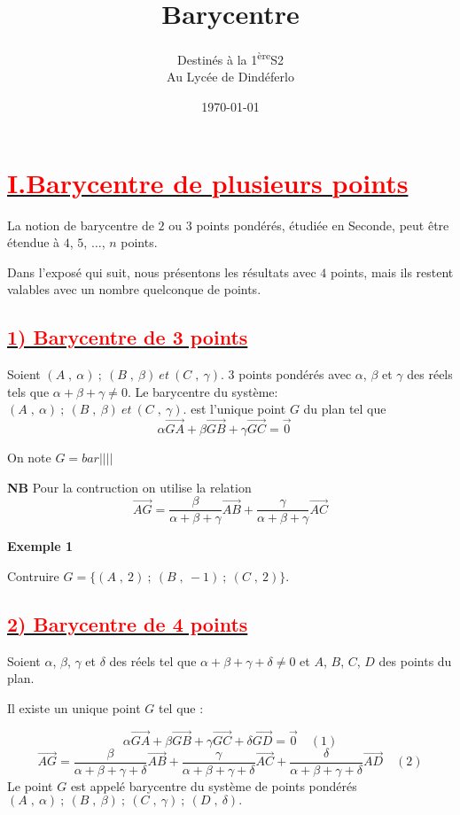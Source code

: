 \documentclass{article}
\author{Destinés à la 1\textsuperscript{ère}S2\\Au Lycée de Dindéferlo}
\title{\textbf{Barycentre}}
\date{\today}
\begin{document}
\maketitle
\newpage

\section*{\underline{\textbf{\textcolor{red}{I.Barycentre de plusieurs points}}}}
	La notion de barycentre de $2$ ou $3$ points pondérés, étudiée en Seconde, peut être étendue à $4$, $5$, $\ldots$, $n$ points. 
	
	Dans l'exposé qui suit, nous présentons les résultats avec $4$ points, mais ils restent valables avec un nombre quelconque de points.
	\subsection*{\underline{\textbf{\textcolor{red}{1) Barycentre de 3 points }}}}
	Soient $(A\;,\ \alpha)\ ;\ (B\;,\ \beta)\ et \ (C\;,\ \gamma).$ 3 points pondérés avec $\alpha$, $\beta$ et $\gamma$ des réels tels que $\alpha+\beta+\gamma\neq 0$. Le barycentre du système: $(A\;,\ \alpha)\ ;\ (B\;,\ \beta)\ et \ (C\;,\ \gamma).$ est l'unique point $G$ du plan tel que $$\alpha\overrightarrow{GA}+\beta\overrightarrow{GB}+\gamma\overrightarrow{GC}=\overrightarrow{0}\quad$$

On note  $G=bar||||$

\textbf{NB} Pour la contruction on utilise la relation $$\overrightarrow{AG}=\dfrac{\beta}{\alpha+\beta+\gamma}\overrightarrow{AB}+\dfrac{\gamma}{\alpha+\beta+\gamma}\overrightarrow{AC}$$

\textbf{Exemple 1}

Contruire $G=\{(A\;,\ 2)\ ;\ (B\;,\ -1)\ ;\ (C\;,\ 2) \}.$

	\subsection*{\underline{\textbf{\textcolor{red}{2) Barycentre de 4 points }}}}
	
	Soient $\alpha$, $\beta$, $\gamma$ et $\delta$ des réels tel que $\alpha+\beta+\gamma+\delta\neq 0$ et $A$, $B$, $C$, $D$ des points du plan. 
	
	Il existe un unique point $G$ tel que :
	
	$$\alpha\overrightarrow{GA}+\beta\overrightarrow{GB}+\gamma\overrightarrow{GC}+\delta\overrightarrow{GD}=\overrightarrow{0}\quad(1)$$
	$$\overrightarrow{AG}=\dfrac{\beta}{\alpha+\beta+\gamma+\delta}\overrightarrow{AB}+\dfrac{\gamma}{\alpha+\beta+\gamma+\delta}\overrightarrow{AC}+\dfrac{\delta} {\alpha+\beta+\gamma+\delta}\overrightarrow{AD}\quad(2)$$
	Le point $G$ est appelé barycentre du système de points pondérés ${(A\;,\ \alpha)\ ;\ (B\;,\ \beta)\ ;\ (C\;,\ \gamma)\ ;\ (D\;,\ \delta)}.$
	
\end{document}
